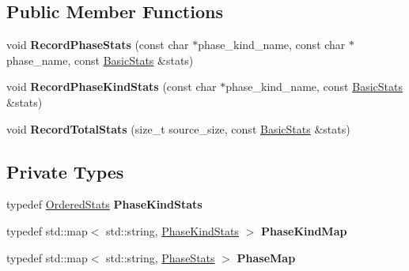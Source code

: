\subsection*{Public Member Functions}
\begin{DoxyCompactItemize}
\item 
void {\bfseries Record\+Phase\+Stats} (const char $\ast$phase\+\_\+kind\+\_\+name, const char $\ast$phase\+\_\+name, const \hyperlink{classv8_1_1internal_1_1_compilation_statistics_1_1_basic_stats}{Basic\+Stats} \&stats)\hypertarget{classv8_1_1internal_1_1_compilation_statistics_a0248f4a218dc1fd98f0065c925c582e2}{}\label{classv8_1_1internal_1_1_compilation_statistics_a0248f4a218dc1fd98f0065c925c582e2}

\item 
void {\bfseries Record\+Phase\+Kind\+Stats} (const char $\ast$phase\+\_\+kind\+\_\+name, const \hyperlink{classv8_1_1internal_1_1_compilation_statistics_1_1_basic_stats}{Basic\+Stats} \&stats)\hypertarget{classv8_1_1internal_1_1_compilation_statistics_a8004a24dfaa736b2fa06521d85a6fc7d}{}\label{classv8_1_1internal_1_1_compilation_statistics_a8004a24dfaa736b2fa06521d85a6fc7d}

\item 
void {\bfseries Record\+Total\+Stats} (size\+\_\+t source\+\_\+size, const \hyperlink{classv8_1_1internal_1_1_compilation_statistics_1_1_basic_stats}{Basic\+Stats} \&stats)\hypertarget{classv8_1_1internal_1_1_compilation_statistics_a0c3a792d35bd4e9c6c49409e0fb5c9ee}{}\label{classv8_1_1internal_1_1_compilation_statistics_a0c3a792d35bd4e9c6c49409e0fb5c9ee}

\end{DoxyCompactItemize}
\subsection*{Private Types}
\begin{DoxyCompactItemize}
\item 
typedef \hyperlink{classv8_1_1internal_1_1_compilation_statistics_1_1_ordered_stats}{Ordered\+Stats} {\bfseries Phase\+Kind\+Stats}\hypertarget{classv8_1_1internal_1_1_compilation_statistics_a80ff8d0a4791579d578545d9e73b4b39}{}\label{classv8_1_1internal_1_1_compilation_statistics_a80ff8d0a4791579d578545d9e73b4b39}

\item 
typedef std\+::map$<$ std\+::string, \hyperlink{classv8_1_1internal_1_1_compilation_statistics_1_1_ordered_stats}{Phase\+Kind\+Stats} $>$ {\bfseries Phase\+Kind\+Map}\hypertarget{classv8_1_1internal_1_1_compilation_statistics_a8c72fbbaef548e798ba4941e7642471c}{}\label{classv8_1_1internal_1_1_compilation_statistics_a8c72fbbaef548e798ba4941e7642471c}

\item 
typedef std\+::map$<$ std\+::string, \hyperlink{classv8_1_1internal_1_1_compilation_statistics_1_1_phase_stats}{Phase\+Stats} $>$ {\bfseries Phase\+Map}\hypertarget{classv8_1_1internal_1_1_compilation_statistics_ab60f80699527cb46f553cfe0593b9e83}{}\label{classv8_1_1internal_1_1_compilation_statistics_ab60f80699527cb46f553cfe0593b9e83}

\end{DoxyCompactItemize}
